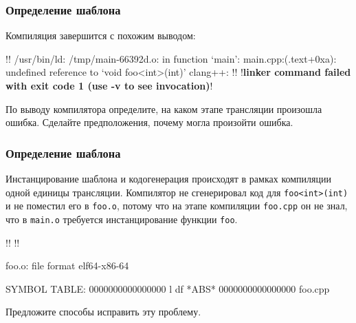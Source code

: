 \documentclass[compress, 8pt, aspectratio=169]{beamer}
\begin{document}
  \begin{frame}[fragile]

    \frametitle{Определение шаблона}

    Компиляция завершится с похожим выводом:

    \begin{terminalwindow}
!!
/usr/bin/ld: /tmp/main-66392d.o: in function `main':
main.cpp:(.text+0xa): undefined reference to `void foo<int>(int)'
clang++: !\color{red}{error:}! !\textbf{linker command failed with exit code 1 (use -v to see invocation)}!
    \end{terminalwindow}

    \begin{task}
      По выводу компилятора определите, на каком этапе трансляции произошла ошибка.
      Сделайте предположения, почему могла произойти ошибка.
    \end{task}

  \end{frame}

  \begin{frame}[fragile]

    \frametitle{Определение шаблона}

    Инстанцирование шаблона и кодогенерация происходят в рамках компиляции
    одной единицы трансляции.
    Компилятор не сгенерировал код для \verb|foo<int>(int)| и не поместил
    его в \verb|foo.o|, потому что на этапе компиляции \verb|foo.cpp| он не
    знал, что в \verb|main.o| требуется инстанцирование функции
    \verb|foo|.

    \begin{terminalwindow}
!!
!!

foo.o:     file format elf64-x86-64

SYMBOL TABLE:
0000000000000000 l    df *ABS*  0000000000000000 foo.cpp
    \end{terminalwindow}

    \begin{task}
      Предложите способы исправить эту проблему.
    \end{task}

  \end{frame}
\end{document}
